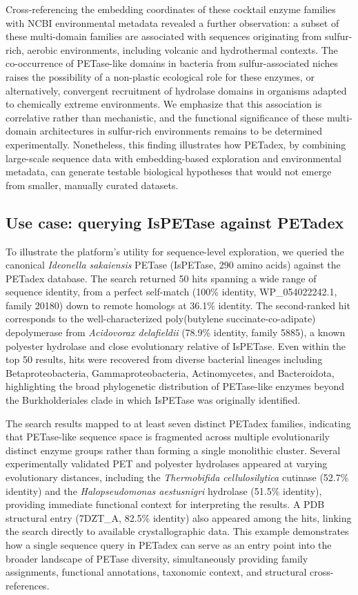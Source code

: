 \documentclass[unnumsec,webpdf,modern,large]{oup-authoring-template}
\begin{document}
Cross-referencing the embedding coordinates of these cocktail enzyme families with NCBI environmental metadata revealed a further observation: a subset of these multi-domain families are associated with sequences originating from sulfur-rich, aerobic environments, including volcanic and hydrothermal contexts. The co-occurrence of PETase-like domains in bacteria from sulfur-associated niches raises the possibility of a non-plastic ecological role for these enzymes, or alternatively, convergent recruitment of hydrolase domains in organisms adapted to chemically extreme environments. We emphasize that this association is correlative rather than mechanistic, and the functional significance of these multi-domain architectures in sulfur-rich environments remains to be determined experimentally. Nonetheless, this finding illustrates how PETadex, by combining large-scale sequence data with embedding-based exploration and environmental metadata, can generate testable biological hypotheses that would not emerge from smaller, manually curated datasets.

\subsection{Use case: querying IsPETase against PETadex}

To illustrate the platform's utility for sequence-level exploration, we queried the canonical \textit{Ideonella sakaiensis} PETase (IsPETase, 290 amino acids) against the PETadex database. The search returned 50 hits spanning a wide range of sequence identity, from a perfect self-match (100\% identity, WP\_054022242.1, family 20180) down to remote homologs at 36.1\% identity. The second-ranked hit corresponds to the well-characterized poly(butylene succinate-co-adipate) depolymerase from \textit{Acidovorax delafieldii} (78.9\% identity, family 5885), a known polyester hydrolase and close evolutionary relative of IsPETase. Even within the top 50 results, hits were recovered from diverse bacterial lineages including Betaproteobacteria, Gammaproteobacteria, Actinomycetes, and Bacteroidota, highlighting the broad phylogenetic distribution of PETase-like enzymes beyond the Burkholderiales clade in which IsPETase was originally identified.

The search results mapped to at least seven distinct PETadex families, indicating that PETase-like sequence space is fragmented across multiple evolutionarily distinct enzyme groups rather than forming a single monolithic cluster. Several experimentally validated PET and polyester hydrolases appeared at varying evolutionary distances, including the \textit{Thermobifida cellulosilytica} cutinase (52.7\% identity) and the \textit{Halopseudomonas aestusnigri} hydrolase (51.5\% identity), providing immediate functional context for interpreting the results. A PDB structural entry (7DZT\_A, 82.5\% identity) also appeared among the hits, linking the search directly to available crystallographic data. This example demonstrates how a single sequence query in PETadex can serve as an entry point into the broader landscape of PETase diversity, simultaneously providing family assignments, functional annotations, taxonomic context, and structural cross-references.
\end{document}
